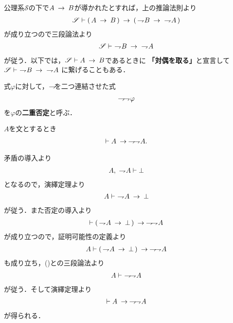 	公理系$\mathscr{S}$の下で$A \rarrow B$が導かれたとすれば，上の推論法則より
	\begin{align}
		\mathscr{S} \vdash (\, A \rarrow B\, ) 
		\rarrow (\, \negation B \rarrow\ \negation A\, )
	\end{align}
	が成り立つので三段論法より
	\begin{align}
		\mathscr{S} \vdash\ \negation B \rarrow\ \negation A
	\end{align}
	が従う．以下では，$\mathscr{S} \vdash A \rarrow B$であるときに
	{\bf 「対偶を取る」}と宣言して$\mathscr{S} \vdash\ \negation B \rarrow\ \negation A$
	に繋げることもある．
	
	式$\varphi$に対して，$\negation$を二つ連結させた式
	\begin{align}
		\negation \negation \varphi
	\end{align}
	を$\varphi$の{\bf 二重否定}と呼ぶ．
	
	\begin{screen}
		\begin{logicalthm}[二重否定の導入]
		\label{logicalthm:introduction_of_double_negation}
			$A$を文とするとき
			\begin{align}
				\vdash A \rarrow \negation \negation A.
			\end{align}
		\end{logicalthm}
	\end{screen}
	
	\begin{prf}
		矛盾の導入より
		\begin{align}
			A,\ \negation A \vdash \bot
		\end{align}
		となるので，演繹定理より
		\begin{align}
			A \vdash\ \negation A \rarrow \bot
			\label{fom:introduction_of_double_negation}
		\end{align}
		が従う．また否定の導入より
		\begin{align}
			\vdash (\, \negation A \rarrow \bot\, ) \rarrow \negation \negation A
		\end{align}
		が成り立つので，証明可能性の定義より
		\begin{align}
			A \vdash (\, \negation A \rarrow \bot\, ) \rarrow \negation \negation A
		\end{align}
		も成り立ち，()との三段論法より
		\begin{align}
			A \vdash\ \negation \negation A
		\end{align}
		が従う．そして演繹定理より
		\begin{align}
			\vdash A \rarrow \negation \negation A
		\end{align}
		が得られる．
		\QED
	\end{prf}
	
